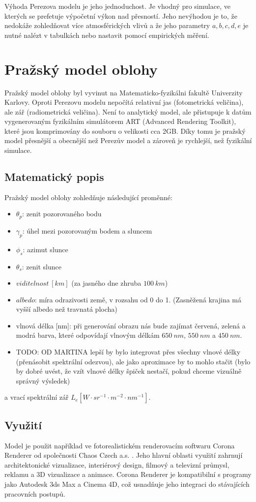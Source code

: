 Výhoda Perezova modelu je jeho jednoduchost. Je vhodný pro simulace, ve kterých se prefetuje výpočetní výkon nad přesností. Jeho nevýhodou je to, že nedokáže zohledňovat více atmosférických vlivů a že jeho parametry $a, b, c, d, e$ je nutné nalézt v tabulkách nebo nastavit pomocí empirických měření.

\section{Pražský model oblohy}

Pražský model oblohy \citep{Prague2021} byl vyvinut na Matematicko-fyzikálni fakultě Univerzity Karlovy. 
Oproti Perezovu modelu nepočítá relativní jas (fotometrická veličina), ale zář (radiometrická veličina). 
Není to analytický model, ale přistupuje k datům vygenerovaným fyzikálním simulátorem ART (Advanced Rendering Toolkit), které jsou komprimovány do souboru o velikosti cca 2GB. 
Díky tomu je pražský model přesnější a obecnější než Perezův model a zároveň je rychlejší, než fyzikální simulace.

\subsection{Matematický popis}
Pražský model oblohy zohledňuje následující proměnné: 
\begin{itemize}
  \item $\theta_p$: zenit pozorovaného bodu
  \item $\gamma_p$: úhel mezi pozorovaným bodem a sluncem
  \item $\phi_s$: azimut slunce
  \item $\theta_s$: zenit slunce
  \item $viditelnost~[km]$ (za jasného dne zhruba $100~km$)
  \item $albedo$: míra odrazivosti země, v rozsahu od 0 do 1. (Zasněžená krajina má vyšší albedo než travnatá plocha)
  \item vlnová délka [nm]: při generování obrazu nás bude zajímat červená, zelená a modrá barva, které odpovídají vlnovým délkám $650~nm$, $550~nm$ a $450~nm$. 
  \item TODO: OD MARTINA lepší by bylo integrovat přes všechny vlnové délky (přenásobit spektrální odezvou), ale jako aproximace by to mohlo stačit (bylo by dobré uvést, že vzít vlnové délky špiček nestačí, pokud chceme vizuálně správný výsledek)
\end{itemize}
a vrací spektrální zář  $L_e [W \cdot sr^{-1} \cdot m^{-2} \cdot nm^{-1}]$.
\subsection{Využití}
Model je použit například ve fotorealistickém renderovacím softwaru Corona Renderer od společnosti Chaos Czech a.s. \citep{corona}. 
Jeho hlavní oblasti využití zahrnují architektonické vizualizace, interiérový design, filmový a televizní průmysl, reklamu a 3D vizualizace a animace. Corona Renderer je kompatibilní s programy jako Autodesk 3ds Max a Cinema 4D, což usnadňuje jeho integraci do stávajících pracovních postupů.

